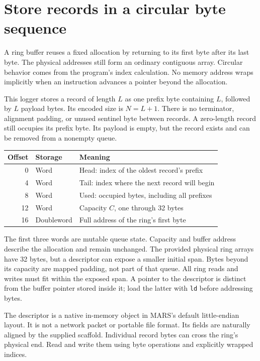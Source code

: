 \section{Store records in a circular byte sequence}
A ring buffer reuses a fixed allocation by returning to its first byte after its
last byte. The physical addresses still form an ordinary contiguous array. Circular
behavior comes from the program's index calculation. No memory address wraps
implicitly when an instruction advances a pointer beyond the allocation.

This logger stores a record of length \(L\) as one prefix byte containing \(L\),
followed by \(L\) payload bytes. Its encoded size is \(N=L+1\). There is no terminator,
alignment padding, or unused sentinel byte between records. A zero-length record
still occupies its prefix byte. Its payload is empty, but the record exists and
can be removed from a nonempty queue.

\begin{longtable}{rll}
  \toprule Offset & Storage    & Meaning                                      \\\midrule
  0               & Word       & Head: index of the oldest record's prefix    \\
  4               & Word       & Tail: index where the next record will begin \\
  8               & Word       & Used: occupied bytes, including all prefixes \\
  12              & Word       & Capacity \(C\), one through 32 bytes         \\
  16              & Doubleword & Full address of the ring's first byte        \\\bottomrule
\end{longtable}
The first three words are mutable queue state. Capacity and buffer address describe
the allocation and remain unchanged. The provided physical ring arrays have 32
bytes, but a descriptor can expose a smaller initial span. Bytes beyond its capacity
are mapped padding, not part of that queue. All ring reads and writes must fit
within the exposed span. A pointer to the descriptor is distinct from the buffer
pointer stored inside it; load the latter with \texttt{ld} before addressing bytes.

The descriptor is a native in-memory object in MARS's default little-endian layout.
It is not a network packet or portable file format. Its fields are naturally aligned
by the supplied scaffold. Individual record bytes can cross the ring's physical end.
Read and write them using byte operations and explicitly wrapped indices.

